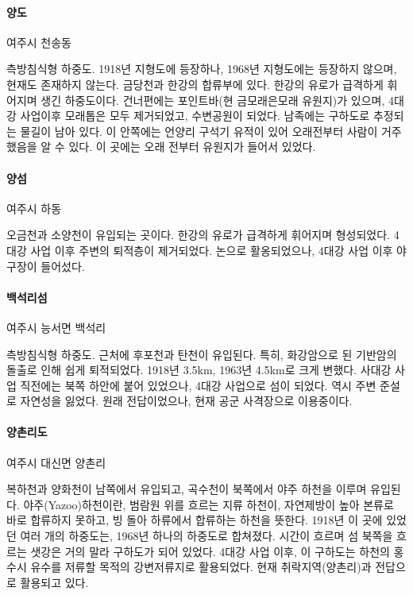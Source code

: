 \paragraph{양도}
여주시 천송동

측방침식형 하중도. 1918년 지형도에 등장하나, 1968년 지형도에는 등장하지 않으며, 현재도 존재하지 않는다.
금당천과 한강의 합류부에 있다.
한강의 유로가 급격하게 휘어지며 생긴 하중도이다. 건너편에는 포인트바(현 금모래은모래 유원지)가 있으며,
4대강 사업이후 모래톱은 모두 제거되었고, 수변공원이 되었다. 남족에는 구하도로 추정되는 물길이 남아 있다.
이 안쪽에는 언양리 구석기 유적이 있어 오래전부터 사람이 거주했음을 알 수 있다.
이 곳에는 오래 전부터 유원지가 들어서 있었다.
\paragraph{양섬}
여주시 하동

오금천과 소양천이 유입되는 곳이다. 한강의 유로가 급격하게 휘어지며 형성되었다. 4대강 사업 이후 주변의 퇴적층이 제거되었다.
논으로 활옹되었으나, 4대강 사업 이후 야구장이 들어섰다.

\paragraph{백석리섬}
여주시 능서면 백석리

측방침식형 하중도. 근처에 후포천과 탄천이 유입된다. 특히, 화강암으로 된 기반암의 돌출로 인해 쉽게 퇴적되었다.
1918년 3.5km, 1963년 4.5km로 크게 변했다. 사대강 사업 직전에는 북쪽 하안에 붙어 있었으나, 4대강 사업으로 섬이 되었다.
역시 주변 준설로 자연성을 잃었다.
원래 전답이었으나, 현재 공군 사격장으로 이용중이다.


\paragraph{양촌리도}
여주시 대신면 양촌리

복하천과 양화천이 남쪽에서 유입되고, 곡수천이 북쪽에서 야주 하천을 이루며 유입된다.
야주(Yazoo)하천이란, 범람원 위를 흐르는 지류 하천이, 자연제방이 높아 본류로 바로 합류하지 못하고, 빙 돌아 하류에서 합류하는 하천을 뜻한다.
1918년 이 곳에 있었던 여러 개의 하중도는, 1968년 하나의 하중도로 합쳐졌다. 
시간이 흐르며 섬 북쪽을 흐르는 샛강은 거의 말라 구하도가 되어 있었다.
4대강 사업 이후, 이 구하도는 하천의 홍수시 유수를 저류할 목적의 강변저류지로 활용되었다. 
현재 취락지역(양촌리)과 전답으로 활용되고 있다. 


